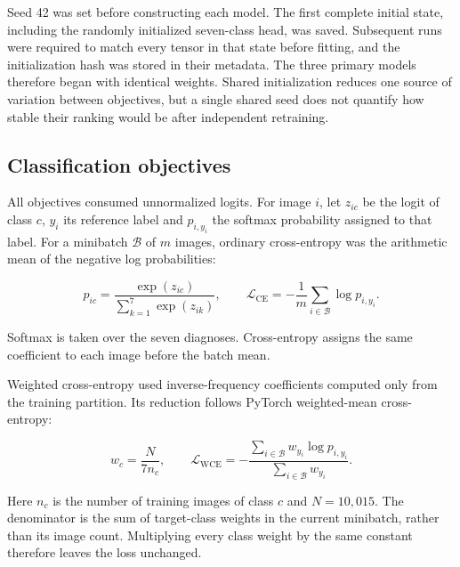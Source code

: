 \documentclass[11pt,a4paper]{article}
\begin{document}
Seed 42 was set before constructing each model. The first complete initial state, including the randomly initialized seven-class head, was saved. Subsequent runs were required to match every tensor in that state before fitting, and the initialization hash was stored in their metadata. The three primary models therefore began with identical weights. Shared initialization reduces one source of variation between objectives, but a single shared seed does not quantify how stable their ranking would be after independent retraining.



\subsection*{Classification objectives}

All objectives consumed unnormalized logits. For image $i$, let $z_{ic}$ be the logit of class $c$, $y_i$ its reference label and $p_{i,y_i}$ the softmax probability assigned to that label. For a minibatch $\mathcal{B}$ of $m$ images, ordinary cross-entropy was the arithmetic mean of the negative log probabilities:




\begin{equation}
\label{eq:classification-ce}
p_{ic}=\frac{\exp(z_{ic})}{\sum_{k=1}^{7}\exp(z_{ik})},\qquad \mathcal{L}_{\mathrm{CE}}=-\frac{1}{m}\sum_{i\in\mathcal{B}}\log p_{i,y_i}.
\end{equation}


Softmax is taken over the seven diagnoses. Cross-entropy assigns the same coefficient to each image before the batch mean.



Weighted cross-entropy used inverse-frequency coefficients computed only from the training partition. Its reduction follows PyTorch weighted-mean cross-entropy:




\begin{equation}
\label{eq:classification-wce}
w_c=\frac{N}{7n_c},\qquad \mathcal{L}_{\mathrm{WCE}}=-\frac{\sum_{i\in\mathcal{B}}w_{y_i}\log p_{i,y_i}}{\sum_{i\in\mathcal{B}}w_{y_i}}.
\end{equation}


Here $n_c$ is the number of training images of class $c$ and $N=10{,}015$. The denominator is the sum of target-class weights in the current minibatch, rather than its image count. Multiplying every class weight by the same constant therefore leaves the loss unchanged.
\end{document}
